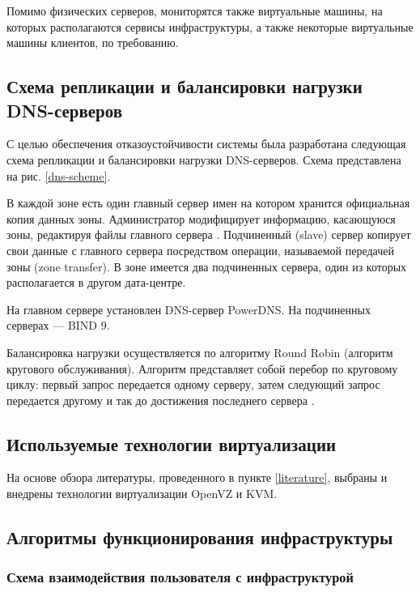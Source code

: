 Помимо физических серверов, мониторятся также виртуальные машины, на которых располагаются сервисы инфраструктуры, а также некоторые виртуальные машины клиентов, по требованию.

\subsection{Схема репликации и балансировки нагрузки DNS-серверов}

С целью обеспечения отказоустойчивости системы была разработана следующая схема репликации и балансировки нагрузки DNS-серверов.
Схема представлена на рис. \ref{dns-scheme}.

В каждой зоне есть один главный сервер имен на котором хранится официальная копия данных зоны.
Администратор модифицирует информацию, касающуюся зоны, редактируя файлы главного сервера \cite{unix-handbook}.
Подчиненный (slave) сервер копирует свои данные с главного сервера посредством операции, называемой передачей зоны (zone transfer).
В зоне имеется два подчиненных сервера, один из которых располагается в другом дата-центре.

На главном сервере установлен DNS-сервер PowerDNS.
На подчиненных серверах --- BIND 9.

Балансировка нагрузки осуществляется по алгоритму Round Robin (алгоритм кругового обслуживания).
Алгоритм представляет собой перебор по круговому циклу: первый запрос передается одному серверу, затем следующий запрос передается другому и так до достижения последнего сервера \cite{selectel}.

\subsection{Используемые технологии виртуализации}

На основе обзора литературы, проведенного в пункте \ref{literature}, выбраны и внедрены технологии виртуализации OpenVZ и KVM.

\subsection{Алгоритмы функционирования инфраструктуры}

\subsubsection{Схема взаимодействия пользователя с инфраструктурой}


